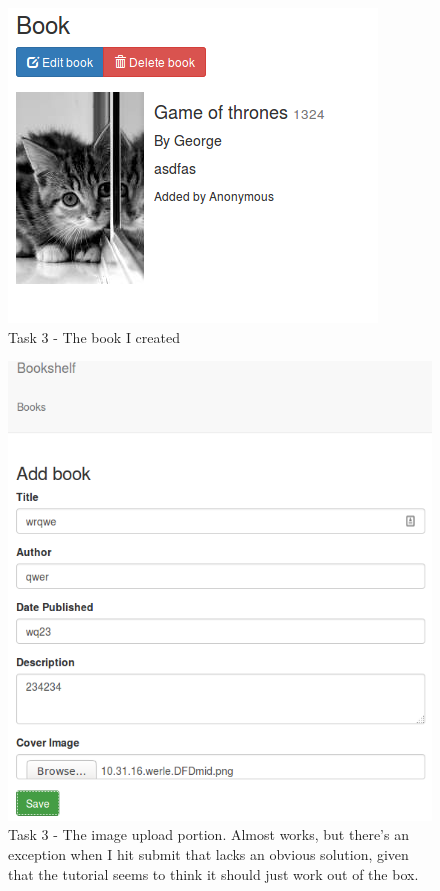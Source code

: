 \documentclass{article}
\makeatletter
\def\maxwidth#1{\ifdim\Gin@nat@width>#1 #1\else\Gin@nat@width\fi}
\makeatother
\begin{document}
	\begin{figure}[ht]
		\includegraphics[width=\maxwidth{5in}]{img/t3s3.png}
		\centering
        \caption{Task 3 - The book I created}
	\end{figure}
	\begin{figure}[ht]
		\includegraphics[width=\maxwidth{5in}]{img/t3s4.png}
		\centering
		\caption{Task 3 - The image upload portion. Almost works, but there's an exception when I hit submit that lacks an obvious solution, given that the tutorial seems to think it should just work out of the box.}
	\end{figure}
	
\end{document}
